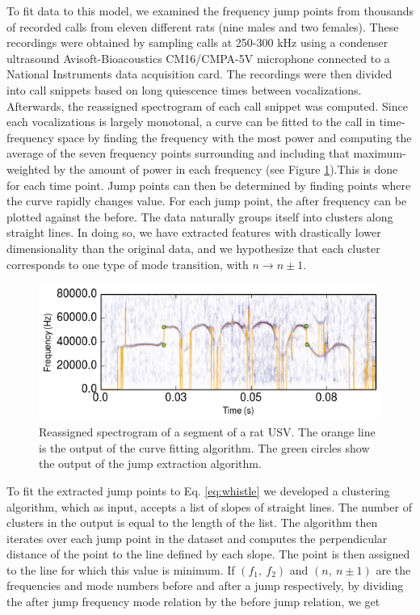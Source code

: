 \documentclass[twocolumn, prl]{revtex4}
\begin{document}
To fit data to this model, we examined the frequency jump points from thousands of recorded calls from eleven different rats (nine males and two females). These recordings were obtained by sampling calls at 250-300 kHz using a condenser ultrasound Avisoft-Bioacoustics CM16/CMPA-5V microphone connected to a National Instruments data acquisition card. The recordings were then divided into call snippets based on long quiescence times between vocalizations. Afterwards, the reassigned spectrogram of each call snippet was computed. Since each vocalizations is largely monotonal, a curve can be fitted to the call in time-frequency space by finding the frequency with the most power and computing the average of the seven frequency points surrounding and including that maximum- weighted by the amount of power in each frequency (see Figure \ref{fig:specgram}).This is done for each time point. Jump points can then be determined by finding points where the curve rapidly changes value. For each jump point, the after frequency can be plotted against the before. The data naturally groups itself into clusters along straight lines. In doing so, we have extracted features with drastically lower dimensionality than the original data, and we hypothesize that each cluster corresponds to one type of mode transition, with $n\rightarrow n\pm1$. 
\begin{figure}[!ht]
\centering
\includegraphics[width=\columnwidth]{specgram.png}
\caption{\label{fig:specgram} Reassigned spectrogram of a segment of a rat USV. The orange line is the output of the curve fitting algorithm. The green circles show the output of the jump extraction algorithm.}
\end{figure}
To fit the extracted jump points to Eq. \ref{eq:whistle} we developed a clustering algorithm, which as input, accepts a list of slopes of straight lines. The number of clusters in the output is equal to the length of the list. The algorithm then iterates over each jump point in the dataset and computes the perpendicular distance of the point to the line defined by each slope. The point is then assigned to the line for which this value is minimum. If $\left(f_{1},\: f_{2}\right)$ and $\left(n,\: n\pm1\right)$ are the frequencies and mode numbers before and after a jump respectively, by dividing the after jump frequency mode relation by the before jump relation, we get 
\end{document}
